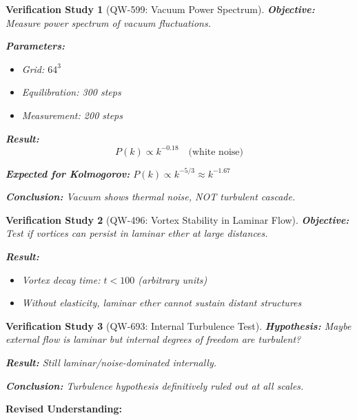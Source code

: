 \documentclass[11pt, a4paper]{article}
\newtheorem{verification}{Verification Study}[section]
\theoremstyle{remark}
\begin{document}
\begin{verification}[QW-599: Vacuum Power Spectrum]
\textbf{Objective:} Measure power spectrum of vacuum fluctuations.

\textbf{Parameters:}
\begin{itemize}
    \item Grid: $64^3$
    \item Equilibration: 300 steps
    \item Measurement: 200 steps
\end{itemize}

\textbf{Result:}
\begin{equation}
P(k) \propto k^{-0.18} \quad \text{(white noise)}
\end{equation}

\textbf{Expected for Kolmogorov:} $P(k) \propto k^{-5/3} \approx k^{-1.67}$

\textbf{Conclusion:} Vacuum shows thermal noise, NOT turbulent cascade.
\end{verification}

\begin{verification}[QW-496: Vortex Stability in Laminar Flow]
\textbf{Objective:} Test if vortices can persist in laminar ether at large distances.

\textbf{Result:}
\begin{itemize}
    \item Vortex decay time: $t < 100$ (arbitrary units)
    \item Without elasticity, laminar ether cannot sustain distant structures
\end{itemize}
\end{verification}

\begin{verification}[QW-693: Internal Turbulence Test]
\textbf{Hypothesis:} Maybe external flow is laminar but internal degrees of freedom are turbulent?

\textbf{Result:} Still laminar/noise-dominated internally.

\textbf{Conclusion:} Turbulence hypothesis definitively ruled out at all scales.
\end{verification}

\textbf{Revised Understanding:}
\begin{center}
\end{center}
\end{document}
